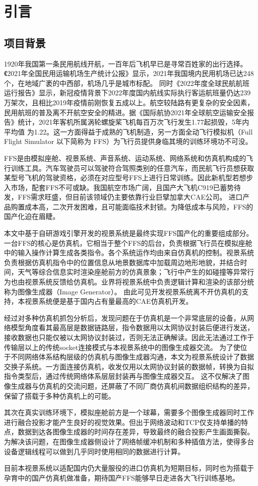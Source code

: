 \chapter{引言}
\section{项目背景}
1920年我国第一条民用航线开航，一百年后飞机早已是寻常百姓家的出行选择。《2021年全国民用运输机场生产统计公报》\cite{minhang}显示，2021年我国境内民用机场已达248个，在地域广袤的中西部，机场几乎是城市标配。
同时《2022年度全球民航航班运行报告》\cite{variflight}显示，新冠疫情背景下2022年度国内航线实际执行客运航班量仍达239万架次，且相比2019年疫情前刚恢复五成以上。航空较陆路有更复杂的安全因素，民用航班的普及离不开航空安全的精进。据《国际航协2021年全球航空运输安全报告》\cite{iata}统计，2021年客机所属涡轮螺旋桨飞机每百万次飞行发生1.77起损毁，5年内平均值
为1.22。这一方面得益于成熟的飞机制造，另一方面全动飞行模拟机（Full Flight Simulator 以下简称为 FFS）为飞行员提供身临其境的训练环境功不可没。
\par
FFS是由模拟座舱、视景系统、声音系统、运动系统、网络系统和仿真机构成的飞行训练工具\cite{simulator3}。汽车驾驶员可以驾驶符合驾照类别的任意汽车，而民航飞行员想获取某型号飞机的驾驶资格，必须在对应型号FFS上进行日常训练。因此新机型若想步入市场，配套FFS不可或缺。我国航空市场广阔，且国产大飞机C919已蓄势待发，FFS需求旺盛，但目前该领域仍主要依靠行业巨擘加拿大CAE公司。
进口产品购置成本高，二次开发困难，且可能面临技术封锁。为降低成本与风险，FFS的国产化迫在眉睫。
\par
本文中基于自研游戏引擎开发的视景系统是最终实现FFS国产化的重要组成部分。
一台FFS的核心是仿真机，它相当于整个FFS的后台，负责根据飞行员在模拟座舱中的输入操作计算生成各类指令。各个系统运作均由来自仿真机的控制。视景系统负责根据仿真机指令中的位置信息从地景数据库中加载周边地形地貌，并结合时间，天气等综合信息实时渲染座舱前方的仿真景象；飞行中产生的如碰撞等异常行为也由视景系统反馈给仿真机。业界将视景系统中负责逻辑计算和渲染的该部分统称为图像生成器（Image Generator）。
由此可见开发视景系统离不开仿真机的支持，本视景系统便是基于国内占有量最高的CAE仿真机开发。
\par
经过对多种仿真机抓包分析后，发现问题在于仿真机是一个非常底层的设备，从网络模型角度看其最高层是数据链路层，指令数据用以太网协议封装后便进行发送，接收数据也只能仅被以太网协议封装过，否则无法正确解读。因此无法通过工作于传输层以上的传统socket连接模式与本视景系统中的图像生成器交流。
为了使位于不同网络体系结构层级的仿真机与图像生成器沟通，本文为视景系统设计了数据交换子系统。一方面连接仿真机，收发仅用以太网协议封装的数据帧，转换为自拟指令类型后，通过传统网络体系层层封装再与图像生成器交互。
这不仅解决了图像生成器与仿真机的交流问题，还屏蔽了不同厂商仿真机间数据组织结构的差异，保留了搭载于多种仿真机上的可能。
\par
其次在真实训练环境下，模拟座舱前方是一个球幕，需要多个图像生成器同时工作进行融合投影才能产生良好的视觉效果。但出于网络波动和TCP仅支持单播的特点，数据到达各图像生成器的时间存在差异，导致最终的融合投影产生画面撕裂。
为解决该问题，在图像生成器侧设计了网络帧缓冲机制和多种插值方法，使得多台设备逻辑线程可以做到几乎同时使用相同的数据进行计算。
\par
目前本视景系统以适配国内仍大量服役的进口仿真机为短期目标，同时也为搭载于孕育中的国产仿真机做准备，期待国产FFS能够早日走进各大飞行训练基地。
